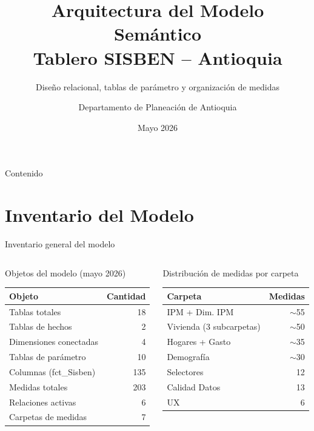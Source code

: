 \documentclass[aspectratio=169, 10pt]{beamer}
\title[Modelo Relacional SISBEN]{Arquitectura del Modelo Sem\'antico\\Tablero SISBEN -- Antioquia}
\subtitle{Dise\~no relacional, tablas de par\'ametro y organizaci\'on de medidas}
\author{Departamento de Planeaci\'on de Antioquia}
\date{Mayo 2026}
\begin{document}
\begin{frame}
  \titlepage
\end{frame}

\begin{frame}{Contenido}
  \tableofcontents
\end{frame}

\section{Inventario del Modelo}

\begin{frame}{Inventario general del modelo}
\begin{columns}
\begin{block}{Objetos del modelo (mayo 2026)}
\begin{tabular}{lr}
\toprule
Objeto & Cantidad \\
\midrule
Tablas totales & 18 \\
\quad Tablas de hechos & 2 \\
\quad Dimensiones conectadas & 4 \\
\quad Tablas de par\'ametro & 10 \\
Columnas (fct\_Sisben) & 135 \\
Medidas totales & 203 \\
Relaciones activas & 6 \\
Carpetas de medidas & 7 \\
\bottomrule
\end{tabular}
\end{block}

\begin{block}{Distribuci\'on de medidas por carpeta}
\begin{tabular}{lr}
\toprule
Carpeta & Medidas \\
\midrule
IPM + Dim. IPM & $\sim$55 \\
Vivienda (3 subcarpetas) & $\sim$50 \\
Hogares + Gasto & $\sim$35 \\
Demograf\'ia & $\sim$30 \\
Selectores & 12 \\
Calidad Datos & 13 \\
UX & 6 \\
\bottomrule
\end{tabular}
\end{block}
\end{columns}
\end{frame}
\end{document}
